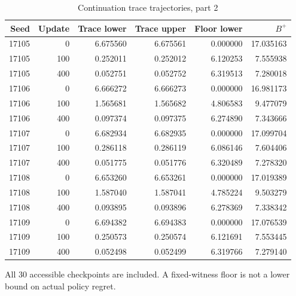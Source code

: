 \begin{table}[htbp]
\centering\small
\caption{Continuation trace trajectories, part 2}\label{tab:r19traces1}
\begin{tabular}{rrrrrr}\toprule
Seed & Update & Trace lower & Trace upper & Floor lower & $B^+$\\
\midrule
17105 & 0 & 6.675560 & 6.675561 & 0.000000 & 17.035163\\
17105 & 100 & 0.252011 & 0.252012 & 6.120253 & 7.555938\\
17105 & 400 & 0.052751 & 0.052752 & 6.319513 & 7.280018\\
17106 & 0 & 6.666272 & 6.666273 & 0.000000 & 16.981173\\
17106 & 100 & 1.565681 & 1.565682 & 4.806583 & 9.477079\\
17106 & 400 & 0.097374 & 0.097375 & 6.274890 & 7.343666\\
17107 & 0 & 6.682934 & 6.682935 & 0.000000 & 17.099704\\
17107 & 100 & 0.286118 & 0.286119 & 6.086146 & 7.604406\\
17107 & 400 & 0.051775 & 0.051776 & 6.320489 & 7.278320\\
17108 & 0 & 6.653260 & 6.653261 & 0.000000 & 17.019389\\
17108 & 100 & 1.587040 & 1.587041 & 4.785224 & 9.503279\\
17108 & 400 & 0.093895 & 0.093896 & 6.278369 & 7.338342\\
17109 & 0 & 6.694382 & 6.694383 & 0.000000 & 17.076539\\
17109 & 100 & 0.250573 & 0.250574 & 6.121691 & 7.553445\\
17109 & 400 & 0.052498 & 0.052499 & 6.319766 & 7.279140\\
\bottomrule
\end{tabular}
\par\smallskip\begin{minipage}{.98\textwidth}\footnotesize All 30 accessible checkpoints are included. A fixed-witness floor is not a lower bound on actual policy regret.\end{minipage}
\end{table}
